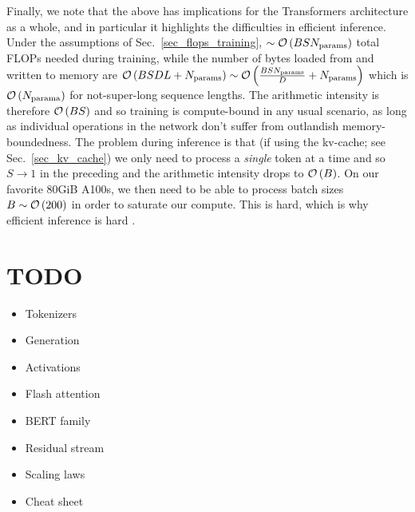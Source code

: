 \documentclass[11pt]{article}
\begin{document}
Finally, we note that the above has implications for the Transformers architecture as a whole, and
in particular it highlights the difficulties in efficient inference. Under the assumptions of
Sec.~\ref{sec_flops_training}, $ \sim \mathcal{O} \left( BSN _{ {\rm params}  }  \right)  $
total FLOPs needed during training, while the number of bytes loaded from and written to memory are
$ \mathcal{O} \left( BSDL + N _{ {\rm params}  } \right)  \sim \mathcal{O} \left( \frac{ BS N _{ {\rm params}  } }{ D}+ N _{ {\rm params}  } \right)  $
which is $ \mathcal{O} \left( N _{ {\rm  parama}  } \right)  $ for not-super-long sequence lengths.  The
arithmetic intensity is therefore $ \mathcal{O} \left( BS \right)  $ and so training is compute-bound in any
usual scenario, as long as individual operations in the network don't suffer from outlandish
memory-boundedness. The problem during inference is that (if using the kv-cache; see
Sec.~\ref{sec_kv_cache}) we only need to process a \textit{single} token at a time and so $ S
\longrightarrow 1 $ in the preceding and the arithmetic intensity drops to $ \mathcal{O} \left( B \right)
$. On our favorite 80GiB A100s, we then need to be able to process batch sizes $ B \sim \mathcal{O} \left(
200 \right)  $ in order to saturate our compute. This is hard, which is why efficient inference is
hard \cite{kipply_inference_math} .

 \section{TODO}


 \begin{itemize}
 \item Tokenizers
 \item Generation
 \item Activations
 \item Flash attention
 \item BERT family
 \item Residual stream
 \item Scaling laws
 \item Cheat sheet
 \end{itemize}



\end{document}
